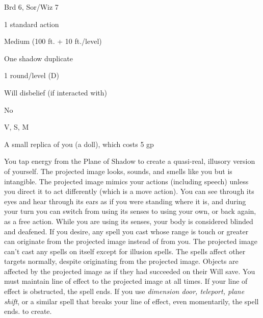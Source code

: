 
\begin{description*}
\item[Level:] Brd 6, Sor/Wiz 7
\item[Casting Time:] 1 standard action
\item[Range:] Medium (100 ft. + 10 ft./level)
\item[Effect:] One shadow duplicate
\item[Duration:] 1 round/level (D)
\item[Saving Throw:] Will disbelief (if interacted with)
\item[Spell Resistance:] No
\item[Components:] V, S, M
\item[Arcane Material Component:] A small replica of you (a doll), which costs 5 gp
\end{description*}

You tap energy from the Plane of Shadow to create a quasi-real, illusory version
of yourself. The projected image looks, sounds, and smells like you but is intangible.
The projected image mimics your actions (including speech) unless you direct it
to act differently (which is a move action).
You can see through its eyes and hear through its ears as if you were standing
where it is, and during your turn you can switch from using its senses to using
your own, or back again, as a free action. While you are using its senses, your
body is considered blinded and deafened.
If you desire, any spell you cast whose range is touch or greater can originate
from the projected image instead of from you. The projected image can't cast any
spells on itself except for illusion spells. The spells affect other targets normally,
despite originating from the projected image.
Objects are affected by the projected image as if they had succeeded on their Will
save.
You must maintain line of effect to the projected image at all times. If your line
of effect is obstructed, the spell ends. If you use \textit{dimension door, teleport,
plane shift}, or a similar spell that breaks your line of effect, even momentarily,
the spell ends.
to create.